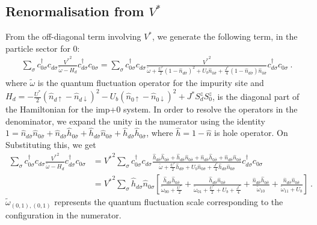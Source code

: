 \documentclass{iopart}
\begin{document}
\subsection{Renormalisation from \({V^*}\)}
From the off-diagonal term involving \({V^*}\), we generate the following term, in the particle sector for \(0\):
\begin{eqnarray}
\sum_\sigma c^\dagger_{0\sigma}c_{d\sigma} \frac{{V^*}^2}{\tilde \omega - H_d} c^\dagger_{d\sigma}c_{0\sigma} = \sum_\sigma c^\dagger_{0\sigma}c_{d\sigma} \frac{{V^*}^2}{\tilde \omega + \frac{U^*}{2}\left( 1 - \hat n_{d\bar\sigma} \right)^2 + U_b \hat n_{0\bar\sigma} + \frac{J^*}{4}\left( 1 - \hat n_{d\bar\sigma} \right) \hat n_{0\bar\sigma} } c^\dagger_{d\sigma}c_{0\sigma}~.
\end{eqnarray}
where \(\tilde \omega\) is the quantum fluctuation operator for the impurity site and \(H_d = -\frac{U^*}{2}\left( \hat n_{d \uparrow} - \hat n_{d \downarrow} \right)^2 - U_b \left( \hat n_{0 \uparrow} - \hat n_{0 \downarrow} \right)^2 + J^*S_d^z S_0^z \), is the diagonal part of the Hamiltonian for the imp+0 system. In order to resolve the operators in the denominator, we expand the unity in the numerator using the identity \(1 = \hat n_{d\bar\sigma}\hat n_{0\bar\sigma} + \hat n_{d\bar\sigma}\hat h_{0\bar\sigma} + \hat h_{d\bar\sigma}\hat n_{0\bar\sigma} + \hat h_{d\bar\sigma}\hat h_{0\bar\sigma}\), where \(\hat h = 1 - \hat n\) is hole operator. On Substituting this, we get
\begin{eqnarray}
	\sum_\sigma  c^\dagger_{0\sigma}c_{d\sigma} \frac{{V^*}^2}{\tilde \omega - H_d} c^\dagger_{d\sigma}c_{0\sigma} &= {V^*}^2 \sum_\sigma c^\dagger_{0\sigma}c_{d\sigma} \frac{\hat h_{d\bar\sigma}\hat h_{0\bar\sigma} + \hat h_{d\bar\sigma}\hat n_{0\bar\sigma} + \hat n_{d\bar\sigma}\hat h_{0\bar\sigma} + \hat n_{d\bar\sigma}\hat n_{0\bar\sigma}}{\tilde \omega + \frac{U^*}{2}\hat h_{d\bar\sigma} + U_b \hat n_{0\bar\sigma} + \frac{J^*}{4}\hat h_{d\bar\sigma} \hat n_{0\bar\sigma} } c^\dagger_{d\sigma}c_{0\sigma}\nonumber\\
														       &= {V^*}^2 \sum_\sigma \hat h_{d\sigma} \hat n_{0\sigma}\left[\frac{\hat h_{d\bar\sigma}\hat h_{0\bar\sigma}}{\tilde\omega_{00} + \frac{U^*}{2}} + \frac{\hat h_{d\bar\sigma}\hat n_{0\bar\sigma}}{\tilde\omega_{01} + \frac{U^*}{2} + U_b + \frac{J^*}{4}} + \frac{\hat n_{d\bar\sigma}\hat h_{0\bar\sigma}}{\tilde\omega_{10}} + \frac{\hat n_{d\bar\sigma}\hat n_{0\bar\sigma}}{\tilde\omega_{11} + U_b}\right]~.\qquad
\end{eqnarray}
\(\tilde\omega_{(0,1),(0,1)}\) represents the quantum fluctuation scale corresponding to the configuration in the numerator.
\end{document}
